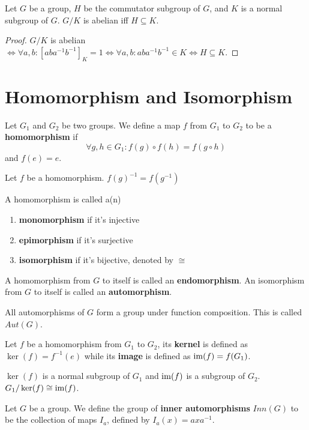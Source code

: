 \documentclass[12pt]{book}
\begin{document}
	\begin{lemma}
		Let $G$ be a group, $H$ be the commutator subgroup of $G$, and $K$ is a normal subgroup of $G$. $G/K$ is abelian iff $H\subseteq K$.
	\end{lemma}
	\begin{proof}
		$G/K$ is abelian $\Leftrightarrow \forall a,b: [aba^{-1}b^{-1}]_K=1\Leftrightarrow \forall a,b:aba^{-1}b^{-1}\in K\Leftrightarrow H\subseteq K$.
	\end{proof}
	
\section{Homomorphism and Isomorphism}
\begin{definition}
	Let $G_1$ and $G_2$ be two groups. We define a map $f$ from $G_1$ to $G_2$ to be a {\bf homomorphism} if
	\begin{equation}
	\forall g,h\in G_1:f(g)\circ f(h)=f(g\circ h)
	\end{equation}
	and $f(e)=e$.
\end{definition}
	\begin{lemma}
		Let $f$ be a homomorphism. $f(g)^{-1}=f(g^{-1})$
	\end{lemma}
\begin{definition}
	A homomorphism is called a(n)
	\begin{enumerate}
		\item {\bf monomorphism} if it's injective
		\item {\bf epimorphism} if it's surjective
		\item {\bf isomorphism} if it's bijective, denoted by $\cong$
	\end{enumerate}
\end{definition}
	
\begin{definition}
	A homomorphism from $G$ to itself is called an {\bf endomorphism}. An isomorphism from $G$ to itself is called an {\bf automorphism}.
\end{definition}
	
\begin{lemma}
	All automorphisms of $G$ form a group under function composition. This is called $Aut(G)$.
\end{lemma}	
	
\begin{definition}
	Let $f$ be a homomorphism from $G_1$ to $G_2$, its {\bf kernel} is defined as $\ker(f)=f^{-1}(e)$ while its {\bf image} is defined as ${\rm im}(f)=f(G_1)$.
\end{definition}
\begin{lemma}
	$\ker(f)$ is a normal subgroup of $G_1$ and ${\rm im} (f)$ is a subgroup of $G_2$. $G_1/\ker(f)\cong{\rm im}(f)$.
\end{lemma}
\begin{definition}
	Let $G$ be a group. We define the group of {\bf inner automorphisms} $Inn(G)$ to be the collection of maps $I_a$, defined by $I_a(x)=axa^{-1}$.
\end{definition}	
		
\end{document}

